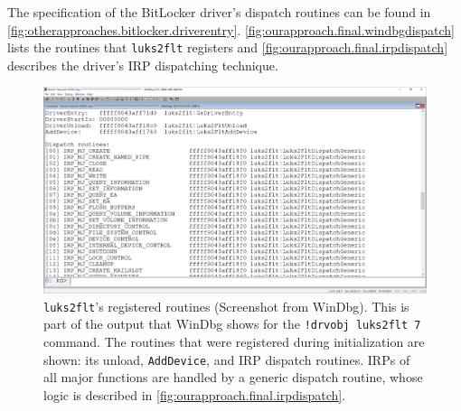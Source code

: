 The specification of the BitLocker driver's dispatch routines can be found in \autoref{fig:otherapproaches.bitlocker.driverentry}. \autoref{fig:ourapproach.final.windbgdispatch} lists the routines that \texttt{luks2flt} registers and \autoref{fig:ourapproach.final.irpdispatch} describes the driver's IRP dispatching technique.

\begin{figure}[htb!]
	\center
	\includegraphics[scale=0.35]{../img/ourapproach.final.windbgdispatch.png}
	\caption[
		\texttt{luks2flt}'s registered routines
	]{
		\texttt{luks2flt}'s registered routines (Screenshot from WinDbg). This is part of the output that WinDbg shows for the \texttt{!drvobj luks2flt 7} command. The routines that were registered during initialization are shown: its unload, \texttt{AddDevice}, and IRP dispatch routines. IRPs of all major functions are handled by a generic dispatch routine, whose logic is described in \autoref{fig:ourapproach.final.irpdispatch}.
	}
	\label{fig:ourapproach.final.windbgdispatch}
\end{figure}

